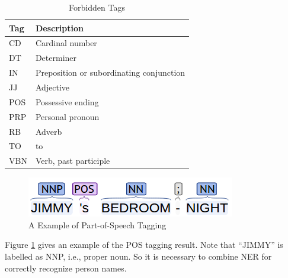 \begin{table}[htb]
\centering
\caption{Forbidden Tags}
\begin{tabular}{ll}
\hline
Tag & Description \\
\hline
CD & Cardinal number\\ 
DT & Determiner\\ 
IN & Preposition or subordinating conjunction\\ 
JJ & Adjective  \\
POS & Possessive ending  \\ 
PRP & Personal pronoun  \\
RB & Adverb\\ 
TO & to \\ 
VBN & Verb, past participle \\ 
\hline
\end{tabular}
\label{tab:forbiddentags}
\end{table}

\begin{figure}[htb]
\centering
\includegraphics[scale=0.6]{figure/dataprep/pos}
\caption{A Example of Part-of-Speech Tagging}
\label{fig:pos}
\end{figure}

Figure \ref{fig:pos} gives an example of the POS tagging result. 
Note that ``JIMMY'' is labelled as NNP, i.e., proper noun. 
So it is necessary to combine NER for correctly recognize person names. \\ 

